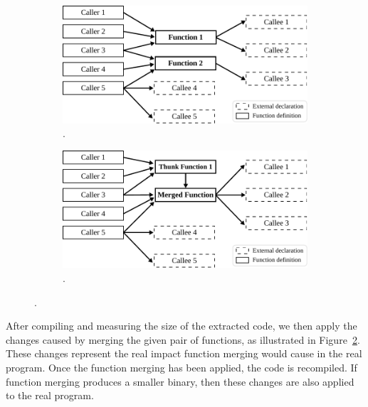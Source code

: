 \begin{figure}[h]
\centering
\begin{subfigure}{\textwidth}
\centering
  \includegraphics[scale=0.8]{src/deeplearning/figs/our-cost-model-callgraph-1.pdf}
  \caption{.}
  \label{fig:our-cost-model-callgraph-1}
\end{subfigure}
\begin{subfigure}{\textwidth}
\centering
  \includegraphics[scale=0.8]{src/deeplearning/figs/our-cost-model-callgraph-2.pdf}
  \caption{.}
  \label{fig:our-cost-model-callgraph-2}
\end{subfigure}
\caption{.}
\label{fig:our-cost-model-callgraphs}
\end{figure}

After compiling and measuring the size of the extracted code, we then apply the changes caused by merging the given pair of functions, as illustrated in Figure~\ref{fig:our-cost-model-callgraph-2}.
These changes represent the real impact function merging would cause in the real program.
Once the function merging has been applied, the code is recompiled.
If function merging produces a smaller binary, then these changes are also applied to the real program.

